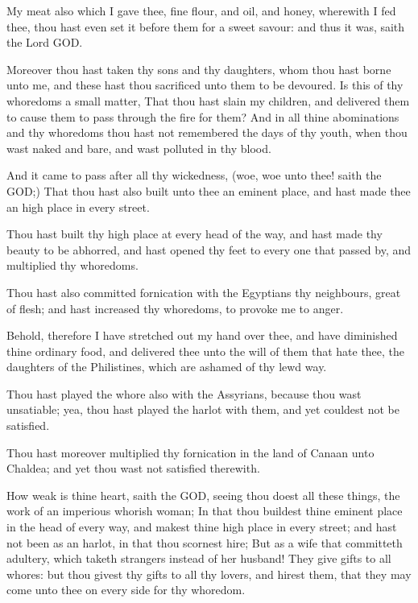 \Verse My meat also which I gave thee, fine flour, and oil, and honey, wherewith I fed thee, thou hast even set it before them for a sweet savour: and thus it was, saith the Lord GOD.

\Verse Moreover thou hast taken thy sons and thy daughters, whom thou hast borne unto me, and these hast thou sacrificed unto them to be devoured. Is this of thy whoredoms a small matter, \Verse That thou hast slain my children, and delivered them to cause them to pass through the fire for them?  \Verse And in all thine abominations and thy whoredoms thou hast not remembered the days of thy youth, when thou wast naked and bare, and wast polluted in thy blood.

\Verse And it came to pass after all thy wickedness, (woe, woe unto thee!  saith the \LORD GOD;) \Verse That thou hast also built unto thee an eminent place, and hast made thee an high place in every street.

\Verse Thou hast built thy high place at every head of the way, and hast made thy beauty to be abhorred, and hast opened thy feet to every one that passed by, and multiplied thy whoredoms.

\Verse Thou hast also committed fornication with the Egyptians thy neighbours, great of flesh; and hast increased thy whoredoms, to provoke me to anger.

\Verse Behold, therefore I have stretched out my hand over thee, and have diminished thine ordinary food, and delivered thee unto the will of them that hate thee, the daughters of the Philistines, which are ashamed of thy lewd way.

\Verse Thou hast played the whore also with the Assyrians, because thou wast unsatiable; yea, thou hast played the harlot with them, and yet couldest not be satisfied.

\Verse Thou hast moreover multiplied thy fornication in the land of Canaan unto Chaldea; and yet thou wast not satisfied therewith.

\Verse How weak is thine heart, saith the \LORD GOD, seeing thou doest all these things, the work of an imperious whorish woman; \Verse In that thou buildest thine eminent place in the head of every way, and makest thine high place in every street; and hast not been as an harlot, in that thou scornest hire; \Verse But as a wife that committeth adultery, which taketh strangers instead of her husband!  \Verse They give gifts to all whores: but thou givest thy gifts to all thy lovers, and hirest them, that they may come unto thee on every side for thy whoredom.


